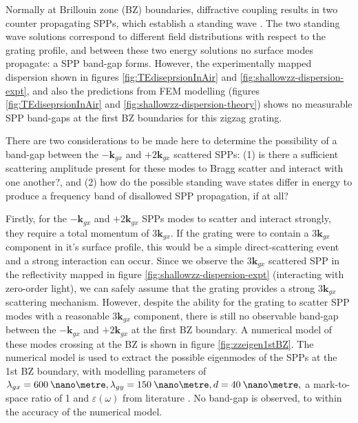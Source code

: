 Normally at Brillouin zone (BZ) boundaries, diffractive coupling results in two counter propagating SPPs, which establish a standing wave \cite{Barnes1996}. The two standing wave solutions correspond to different field distributions with respect to the grating profile, and between these two energy solutions no surface modes propagate: a SPP band-gap forms. However, the experimentally mapped dispersion shown in figures \ref{fig:TEdiseprsionInAir} and \ref{fig:shallowzz-dispersion-expt}, and also the predictions from FEM modelling (figures \ref{fig:TEdiseprsionInAir} and \ref{fig:shallowzz-dispersion-theory}) shows no measurable SPP band-gaps at the first BZ boundaries for this zigzag grating. 

There are two considerations to be made here to determine the possibility of a band-gap between the $-\mathbf{k}_{gx}$ and $+2\mathbf{k}_{gx}$ scattered SPPs: (1) is there a sufficient scattering amplitude present for these modes to Bragg scatter and interact with one another?, and (2) how do the possible standing wave states differ in energy to produce a frequency band of disallowed SPP propagation, if at all? 

Firstly, for the $-\mathbf{k}_{gx}$ and $+2\mathbf{k}_{gx}$ SPPs modes to scatter and interact strongly, they require a total momentum of $3\mathbf{k}_{gx}$. If the grating were to contain a $3\mathbf{k}_{gx}$ component in it's surface profile, this would be a simple direct-scattering event and a strong interaction can occur. Since we observe the $3\mathbf{k}_{gx}$ scattered SPP in the reflectivity mapped in figure \ref{fig:shallowzz-dispersion-expt} (interacting with zero-order light), we can safely assume that the grating provides a strong $3\mathbf{k}_{gx}$ scattering mechanism. However, despite the ability for the grating to scatter SPP modes with a reasonable $3\mathbf{k}_{gx}$ component, there is still no observable band-gap between the $-\mathbf{k}_{gx}$ and $+2\mathbf{k}_{gx}$ at the first BZ boundary. A numerical model of these modes crossing at the BZ is shown in figure \ref{fig:zzeigen1stBZ}. The numerical model is used to extract the possible eigenmodes of the SPPs at the 1st BZ boundary, with modelling parameters of $\lambda_{gx}=600\:\nano\metre, \lambda_{gy}=150\: \nano\metre , d=40\:\nano\metre ,$ a mark-to-space ratio of 1 and $\varepsilon(\omega)$ from literature \cite{Nash1996}. No band-gap is observed, to within the accuracy of the numerical model.

